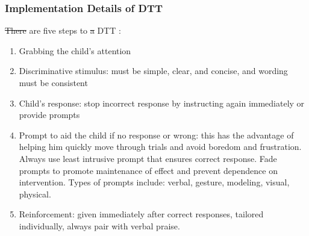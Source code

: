 \documentclass{ut-thesis}
\providecommand{\DIFaddtex}[1]{{\protect\color{blue}\uwave{#1}}} %
\providecommand{\DIFdeltex}[1]{{\protect\color{red}\sout{#1}}}                      %
\providecommand{\DIFaddbegin}{} %
\providecommand{\DIFaddend}{} %
\providecommand{\DIFdelbegin}{} %
\providecommand{\DIFdelend}{} %
\providecommand{\DIFadd}[1]{\texorpdfstring{\DIFaddtex{#1}}{#1}} %
\providecommand{\DIFdel}[1]{\texorpdfstring{\DIFdeltex{#1}}{}} %
\begin{document}
\subsubsection{Implementation Details of DTT}
\DIFdelbegin \DIFdel{There }\DIFdelend \DIFaddbegin \DIFadd{In summary, there }\DIFaddend are five steps to \DIFdelbegin \DIFdel{a }\DIFdelend DTT \cite{bogin2010steps}:
\begin{enumerate}
	\item Grabbing the child's attention
	\item Discriminative stimulus: must be simple, clear, and concise, and wording must be consistent
	\item Child's response: stop incorrect response by instructing again immediately or provide prompts
	\item Prompt to aid the child if no response or wrong: this has the advantage of helping him quickly move through trials and avoid boredom and frustration.  Always use least intrusive prompt that ensures correct response.  Fade prompts to promote maintenance of effect and prevent dependence on intervention.  Types of prompts include: verbal, gesture, modeling, visual, physical.
	\item Reinforcement: given immediately after correct responses, tailored individually, always pair with verbal praise.
\end{enumerate}

\DIFdelbegin %


\end{document}
